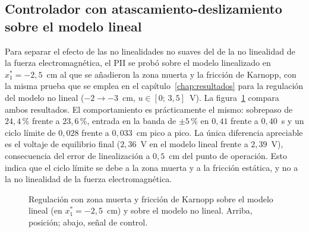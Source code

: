\subsection{Controlador con atascamiento-deslizamiento sobre el modelo lineal}

Para separar el efecto de las no linealidades no suaves del de la no linealidad de la fuerza electromagnética, el PII se probó sobre el modelo linealizado en $x_1^*=-2{,}5$~cm al que se añadieron la zona muerta y la fricción de Karnopp, con la misma prueba que se emplea en el capítulo~\ref{chap:resultados} para la regulación del modelo no lineal ($-2\to-3$~cm, $u\in[0;\,3{,}5]$~V). La figura~\ref{fig:p8_lineal_ad} compara ambos resultados. El comportamiento es prácticamente el mismo: sobrepaso de $24{,}4$\,\% frente a $23{,}6$\,\%, entrada en la banda de $\pm5$\,\% en $0{,}41$ frente a $0{,}40$~s y un ciclo límite de $0{,}028$ frente a $0{,}033$~cm pico a pico. La única diferencia apreciable es el voltaje de equilibrio final ($2{,}36$~V en el modelo lineal frente a $2{,}39$~V), consecuencia del error de linealización a $0{,}5$~cm del punto de operación. Esto indica que el ciclo límite se debe a la zona muerta y a la fricción estática, y no a la no linealidad de la fuerza electromagnética.

\begin{figure}[ht]
    \centering
    
    \caption[Modelo lineal con atascamiento-deslizamiento]{Regulación con zona muerta y fricción de Karnopp sobre el modelo lineal (en $x_1^*=-2{,}5$~cm) y sobre el modelo no lineal. Arriba, posición; abajo, señal de control.}
    \label{fig:p8_lineal_ad}
\end{figure}

\FloatBarrier
